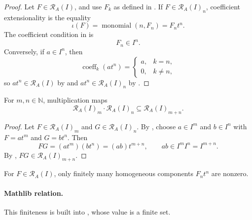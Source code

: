 \begin{proof}
  Let $F\in\mathcal R_A(I)$, and use $F_k$ as defined in
  .  If
  $F\in\mathcal R_A(I)_n$, coefficient extensionality is the equality
  \[
    \iota(F)=\operatorname{monomial}(n,F_n)=F_nt^n.
  \]
  The coefficient condition in  is
  \[
    F_n\in I^n.
  \]
  Conversely, if $a\in I^n$, then
  \[
    \operatorname{coeff}_k(at^n)
      =\begin{cases}a,&k=n,\\0,&k\ne n,
        \end{cases}
  \]
  so $at^n\in\mathcal R_A(I)$ by
   and
  $at^n\in\mathcal R_A(I)_n$ by .
\end{proof}

\begin{lemma}
  \label{lemma:nagata-rees-piece-mul}

  For $m,n\in\mathbb N$, multiplication maps
  \[
    \mathcal R_A(I)_m\cdot\mathcal R_A(I)_n
      \subseteq\mathcal R_A(I)_{m+n}.
  \]
\end{lemma}

\begin{proof}
  Let $F\in\mathcal R_A(I)_m$ and
  $G\in\mathcal R_A(I)_n$.  By
  , choose
  $a\in I^m$ and $b\in I^n$ with $F=at^m$ and $G=bt^n$.  Then
  \[
    FG=(at^m)(bt^n)=(ab)t^{m+n},
    \qquad ab\in I^mI^n=I^{m+n}.
  \]
  By ,
  $FG\in\mathcal R_A(I)_{m+n}$.
\end{proof}

\begin{lemma}
  \label{lemma:nagata-rees-component-finite-support}

  For $F\in\mathcal R_A(I)$, only finitely many homogeneous components
  $F_nt^n$ are nonzero.

  \paragraph{Mathlib relation.}
  This finiteness is built into
  \texttt{}, whose value is a finite set.
\end{lemma}

